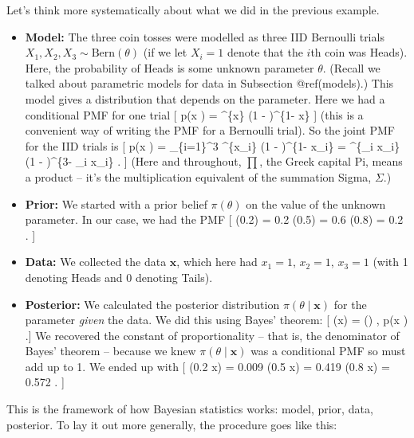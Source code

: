 \documentclass[
  letterpaper,
  DIV=11,
  numbers=noendperiod]{scrreprt}
\providecommand{\tightlist}{%
  \setlength{\itemsep}{0pt}\setlength{\parskip}{0pt}}\usepackage{longtable,booktabs,array}
\theoremstyle{remark}
\begin{document}
Let's think more systematically about what we did in the previous
example.

\begin{itemize}
\tightlist
\item
  \textbf{Model:} The three coin tosses were modelled as three IID
  Bernoulli trials \(X_1, X_2, X_3 \sim \text{Bern}(\theta)\) (if we let
  \(X_i = 1\) denote that the \(i\)th coin was Heads). Here, the
  probability of Heads is some unknown parameter \(\theta\). (Recall we
  talked about parametric models for data in Subsection @ref(models).)
  This model gives a distribution that depends on the parameter. Here we
  had a conditional PMF for one trial {[} p(x \mid \theta) =
  \theta\^{}\{x\} (1 - \theta)\^{}\{1- x\} {]} (this is a convenient way
  of writing the PMF for a Bernoulli trial). So the joint PMF for the
  IID trials is {[} p(\mathbf x \mid \theta) = \prod\_\{i=1\}\^{}3
  \theta\^{}\{x\_i\} (1 - \theta)\^{}\{1- x\_i\} = \theta\^{}\{\sum\_i
  x\_i\} (1 - \theta)\^{}\{3- \sum\_i x\_i\} . {]} (Here and throughout,
  \(\prod\), the Greek capital Pi, means a product -- it's the
  multiplication equivalent of the summation Sigma, \(\Sigma\).)
\item
  \textbf{Prior:} We started with a prior belief \(\pi(\theta)\) on the
  value of the unknown parameter. In our case, we had the PMF {[}
  \pi(0.2) = 0.2 \qquad \pi(0.5) = 0.6 \qquad \pi(0.8) = 0.2 . {]}
\item
  \textbf{Data:} We collected the data \(\mathbf x\), which here had
  \(x_1 = 1\), \(x_2 = 1\), \(x_3 = 1\) (with 1 denoting Heads and 0
  denoting Tails).
\item
  \textbf{Posterior:} We calculated the posterior distribution
  \(\pi(\theta \mid \mathbf x)\) for the parameter \emph{given} the
  data. We did this using Bayes' theorem: {[} \pi(\theta \mid \mathbf x)
  = 
  \propto \pi(\theta) , p(\mathbf x \mid \theta) .{]} We recovered the
  constant of proportionality -- that is, the denominator of Bayes'
  theorem -- because we knew \(\pi(\theta \mid \mathbf x)\) was a
  conditional PMF so must add up to 1. We ended up with {[} \pi(0.2
  \mid \mathbf x) = 0.009 \qquad \pi(0.5 \mid \mathbf x) = 0.419
  \qquad \pi(0.8 \mid \mathbf x) = 0.572 . {]}
\end{itemize}

This is the framework of how Bayesian statistics works: model, prior,
data, posterior. To lay it out more generally, the procedure goes like
this:
\end{document}
